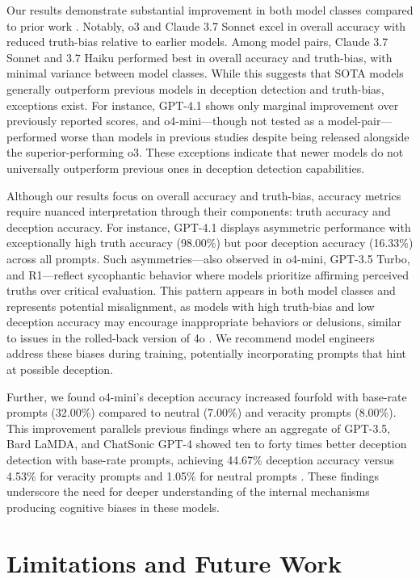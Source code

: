 \documentclass{article}
\begin{document}
Our results demonstrate substantial improvement in both model classes compared to prior work \citep{markowitz_generative_2024}. Notably, o3 and Claude 3.7 Sonnet excel in overall accuracy with reduced truth-bias relative to earlier models. Among model pairs, Claude 3.7 Sonnet and 3.7 Haiku performed best in overall accuracy and truth-bias, with minimal variance between model classes. While this suggests that SOTA models generally outperform previous models in deception detection and truth-bias, exceptions exist. For instance, GPT-4.1 shows only marginal improvement over previously reported scores, and o4-mini---though not tested as a model-pair---performed worse than models in previous studies despite being released alongside the superior-performing o3. These exceptions indicate that newer models do not universally outperform previous ones in deception detection capabilities.

Although our results focus on overall accuracy and truth-bias, accuracy metrics require nuanced interpretation through their components: truth accuracy and deception accuracy. For instance, GPT-4.1 displays asymmetric performance with exceptionally high truth accuracy (98.00\%) but poor deception accuracy (16.33\%) across all prompts. Such asymmetries---also observed in o4-mini, GPT-3.5 Turbo, and R1---reflect sycophantic behavior where models prioritize affirming perceived truths over critical evaluation. This pattern appears in both model classes and represents potential misalignment, as models with high truth-bias and low deception accuracy may encourage inappropriate behaviors or delusions, similar to issues in the rolled-back version of 4o \citep{openai_sycophancy_4o_2025}. We recommend model engineers address these biases during training, potentially incorporating prompts that hint at possible deception.

Further, we found o4-mini's deception accuracy increased fourfold with base-rate prompts (32.00\%) compared to neutral (7.00\%) and veracity prompts (8.00\%). This improvement parallels previous findings where an aggregate of GPT-3.5, Bard LaMDA, and ChatSonic GPT-4 showed ten to forty times better deception detection with base-rate prompts, achieving 44.67\% deception accuracy versus 4.53\% for veracity prompts and 1.05\% for neutral prompts \citep{markowitz_generative_2024}. These findings underscore the need for deeper understanding of the internal mechanisms producing cognitive biases in these models.

\section{Limitations and Future Work}
\label{sec:limitations}
\end{document}
